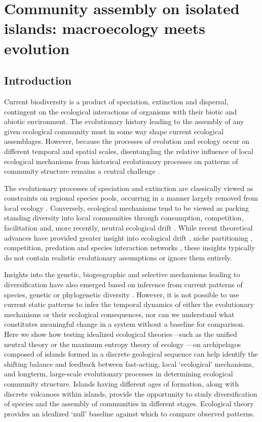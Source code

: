 \chapter{Community assembly on isolated islands: macroecology meets
  evolution}

\section{Introduction}

Current biodiversity is a product of speciation, extinction and
dispersal, contingent on the ecological interactions of organisms with
their biotic and abiotic environment. The evolutionary history leading
to the assembly of any given ecological community must in some way
shape current ecological assemblages. However, because the processes
of evolution and ecology occur on different temporal and spatial
scales, disentangling the relative influence of local ecological
mechanisms from historical evolutionary processes on patterns of
community structure remains a central challenge \citep{ricklefs2004}.

The evolutionary processes of speciation and extinction are
classically viewed as constraints on regional species pools, occurring
in a manner largely removed from local ecology \citep{hubbell2001,
  cavenderbares2009, wiens2011}. Conversely, ecological mechanisms
tend to be viewed as packing standing diversity into local communities
through consumption, competition, facilitation and, more recently,
neutral ecological drift \citep{hubbell2001, tilman2004,
  bascompte2007, borer2014}. While recent theoretical advances have
provided greater insight into ecological drift \citep{hubbell2001,
  rosindell2011ecolLett}, niche partitioning \citep{tilman2004},
competition, predation \citep{borer2014} and species interaction
networks \citep{williams2000, brose2006}, these insights typically do
not contain realistic evolutionary assumptions
\citep{ricklefs2006neutral} or ignore them entirely.

Insights into the genetic, biogeographic and selective mechanisms
leading to diversification have also emerged based on inference from
current patterns of species, genetic or phylogenetic diversity
\citep[e.g.][]{wiens2011, jetz2012}. However, it is not possible to
use current static patterns to infer the temporal dynamics of either
the evolutionary mechanisms or their ecological consequences, nor can
we understand what constitutes meaningful change in a system without a
baseline for comparison. Here we show how testing idealized ecological
theories---such as the unified neutral theory \citep{hubbell2001} or
the maximum entropy theory of ecology \citep{harte2011}---on
archipelagos composed of islands formed in a discrete geological
sequence can help identify the shifting balance and feedback between
fast-acting, local ‘ecological’ mechanisms, and longterm, large-scale
evolutionary processes in determining ecological community
structure. Islands having different ages of formation, along with
discrete volcanoes within islands, provide the opportunity to study
diversification of species and the assembly of communities in
different stages. Ecological theory provides an idealized ‘null’
baseline against which to compare observed patterns.


